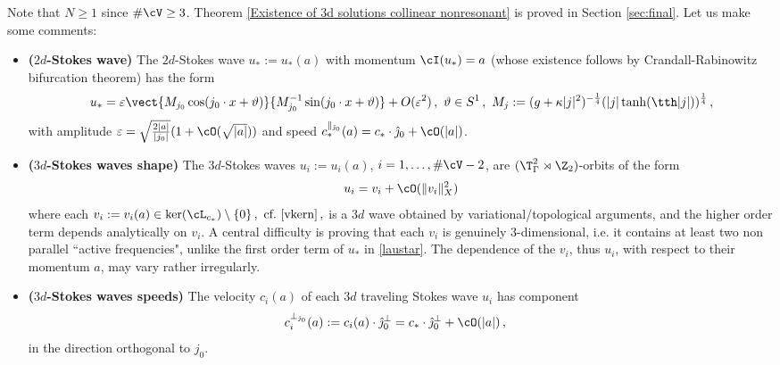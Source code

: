 \documentclass[11pt,a4paper,reqno]{article}
\numberwithin{equation}{section}
\theoremstyle{definition}
\begin{document}
\noindent
Note that $  N  \geq 1 $ since 
$ \# \cV \geq 3 $.
Theorem \ref{Existence of 3d solutions collinear nonresonant} is proved in Section \ref{sec:final}.
Let us make some comments: 
\begin{itemize}
\setlength{\itemsep}{5pt}
\item[(i)] {\bf ($2d$-Stokes wave)} The $ 2 d $-Stokes wave
$ u_* := u_* (a)  $ with momentum $ \cI(u_*) = a $
(whose  existence follows by Crandall-Rabinowitz bifurcation theorem)
has the form 
\begin{equation}
\label{laustar}
u_* = \varepsilon \vect{M_{j_0}\cos(j_0\cdot x+ \vartheta  )}{M_{j_0}^{-1} \sin(j_0 \cdot x+ \vartheta  )} + O(\varepsilon^2) \, , 
\ \vartheta \in S^1 \, ,  \  M_j  := (g + \kappa |j|^2)^{-\frac14}(|j | \tanh (\tth |j|))^{\frac14} \, ,
\end{equation} with amplitude 
$ \varepsilon  = \sqrt{\frac{2|a|}{ |j_0|}}(1+\cO(\sqrt{|a|}))$ 
and speed $ c_*^{\parallel_{\hat \jmath_0} }(a) = 
c_* \cdot {\hat \jmath_0} + \cO(|a|)$. %
\item[(ii)] {\bf ($ 3d$-Stokes waves shape)} 
The  $3d$-Stokes 
waves $u_i := u_i (a) $, $ i=1, \ldots, \#\cV-{2} $, are  
$(\T^2_\Gamma\rtimes \Z_2)$-orbits of  the form 
$$u_i = v_i + \cO(\| v_i\|_X^2)$$
where each $v_i := v_i (a) \in   \ker(\cL_{c_*}) \setminus \{ 0\} \, ,  \ \text{cf.} \   \eqref{vkern} \, , 
$ 
is a $3d$ wave
obtained  by variational/topological  arguments, 
and the higher order term depends analytically on $ v_i $.
A central  difficulty 
is proving  that each  
$v_i$ is  genuinely $3$-dimensional, i.e. it contains  at least two non parallel ``active frequencies",  unlike the first order term of $u_* $ 
in \eqref{laustar}.  
The dependence of the $ v_i  $, thus $ u_i $, 
  with respect to  their momentum $ a $, may vary rather irregularly.  
\item[(iii)]{\bf ($ 3d$-Stokes waves speeds)} The velocity $ c_i (a) $ of each 
$3d$ traveling Stokes wave $u_i$
has  
component 
$$ 
c^{\bot_{\hat \jmath_0}}_i (a) 
:=c_i (a) \cdot \hat \jmath_0^\bot = 
c_*\cdot \hat \jmath_0^\bot  + 
\cO(|a|) \, , 
\quad
$$
in the direction orthogonal to $j_0$.

\end{itemize}
\end{document}
